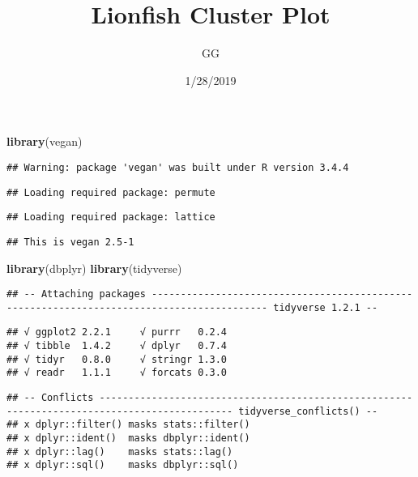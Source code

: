 \documentclass[]{article}
\title{Lionfish Cluster Plot}
\author{GG}
\date{1/28/2019}
\newenvironment{Shaded}{\begin{snugshade}}{\end{snugshade}}
\newcommand{\KeywordTok}[1]{\textcolor[rgb]{0.13,0.29,0.53}{\textbf{#1}}}
\newcommand{\NormalTok}[1]{#1}
\begin{document}
\maketitle

\begin{Shaded}
\begin{Highlighting}[]
\KeywordTok{library}\NormalTok{(vegan)}
\end{Highlighting}
\end{Shaded}

\begin{verbatim}
## Warning: package 'vegan' was built under R version 3.4.4
\end{verbatim}

\begin{verbatim}
## Loading required package: permute
\end{verbatim}

\begin{verbatim}
## Loading required package: lattice
\end{verbatim}

\begin{verbatim}
## This is vegan 2.5-1
\end{verbatim}

\begin{Shaded}
\begin{Highlighting}[]
\KeywordTok{library}\NormalTok{(dbplyr)}
\KeywordTok{library}\NormalTok{(tidyverse)}
\end{Highlighting}
\end{Shaded}

\begin{verbatim}
## -- Attaching packages ------------------------------------------------------------------------------------------ tidyverse 1.2.1 --
\end{verbatim}

\begin{verbatim}
## √ ggplot2 2.2.1     √ purrr   0.2.4
## √ tibble  1.4.2     √ dplyr   0.7.4
## √ tidyr   0.8.0     √ stringr 1.3.0
## √ readr   1.1.1     √ forcats 0.3.0
\end{verbatim}

\begin{verbatim}
## -- Conflicts --------------------------------------------------------------------------------------------- tidyverse_conflicts() --
## x dplyr::filter() masks stats::filter()
## x dplyr::ident()  masks dbplyr::ident()
## x dplyr::lag()    masks stats::lag()
## x dplyr::sql()    masks dbplyr::sql()
\end{verbatim}
\end{document}
